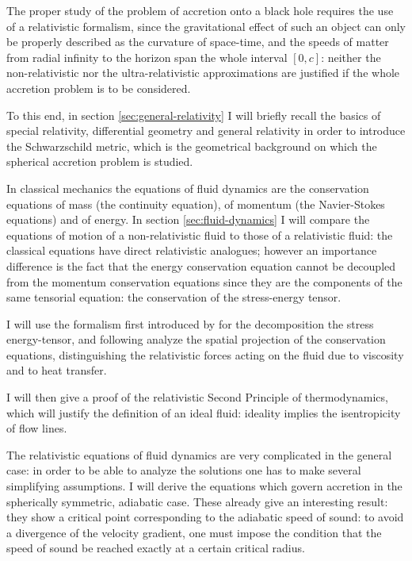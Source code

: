 \documentclass[main.tex]{subfiles}
\begin{document}
The proper study of the problem of accretion onto a black hole requires the use of a relativistic formalism, since the gravitational effect of such an object can only be properly described as the curvature of space-time, and the speeds of matter from radial infinity to the horizon span the whole interval \([0, c]\): neither the non-relativistic nor the ultra-relativistic approximations are justified if the whole accretion problem is to be considered.

To this end, in section \ref{sec:general-relativity} I will briefly recall the basics of special relativity, differential geometry and general relativity in order to introduce the Schwarzschild metric, which is the geometrical background on which the spherical accretion problem is studied.

In classical mechanics the equations of fluid dynamics are the conservation equations of mass (the continuity equation), of momentum (the Navier-Stokes equations) and of energy.
In section \ref{sec:fluid-dynamics} I will compare the equations of motion of a non-relativistic fluid to those of a relativistic fluid: the classical equations have direct relativistic analogues; however an importance difference is the fact that the energy conservation equation cannot be decoupled from the momentum conservation equations since they are the components of the same tensorial equation: the conservation of the stress-energy tensor.

I will use the formalism first introduced by \textcite[]{Eckart:1940} for the decomposition the stress energy-tensor, and following \textcite[]{Taub:1978} analyze the spatial projection of the conservation equations, distinguishing the relativistic forces acting on the fluid due to viscosity and to heat transfer.

I will then give a proof of the relativistic Second Principle of thermodynamics, which will justify the definition of an ideal fluid: ideality implies the isentropicity of flow lines.

The relativistic equations of fluid dynamics are very complicated in the general case: in order to be able to analyze the solutions one has to make several simplifying assumptions.
I will derive the equations which govern accretion in the spherically symmetric, adiabatic case. These already give an interesting result: they show a critical point corresponding to the adiabatic speed of sound: to avoid a divergence of the velocity gradient, one must impose the condition that the speed of sound be reached exactly at a certain critical radius.
\end{document}
